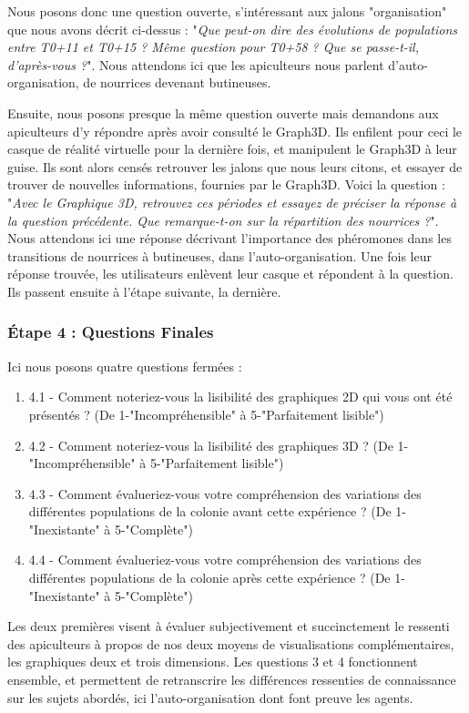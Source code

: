 			Nous posons donc une question ouverte, s'intéressant aux jalons "organisation" que nous avons décrit ci-dessus : "\textit{Que peut-on dire des évolutions de populations entre T0+11 et T0+15 ? Même question pour T0+58 ? Que se passe-t-il, d'après-vous ?}". Nous attendons ici que les apiculteurs nous parlent d'auto-organisation, de nourrices devenant butineuses.
			
			Ensuite, nous posons presque la même question ouverte mais demandons aux apiculteurs d'y répondre après avoir consulté le Graph3D. Ils enfilent pour ceci le casque de réalité virtuelle pour la dernière fois, et manipulent le Graph3D à leur guise. Ils sont alors censés retrouver les jalons que nous leurs citons, et essayer de trouver de nouvelles informations, fournies par le Graph3D. Voici la question : "\textit{Avec le Graphique 3D, retrouvez ces périodes et essayez de préciser la réponse à la question précédente. Que remarque-t-on sur la répartition des nourrices ?}". Nous attendons ici une réponse décrivant l'importance des phéromones dans les transitions de nourrices à butineuses, dans l'auto-organisation. Une fois leur réponse trouvée, les utilisateurs enlèvent leur casque et répondent à la question. Ils passent ensuite à l'étape suivante, la dernière.
			
			\subsubsection{Étape 4 : Questions Finales}
			Ici nous posons quatre questions fermées :
			\begin{enumerate}
				\item 4.1 - Comment noteriez-vous la lisibilité des graphiques 2D qui vous ont été présentés ? (De 1-"Incompréhensible" à 5-"Parfaitement lisible")
				\item 4.2 - Comment noteriez-vous la lisibilité des graphiques 3D ? (De 1-"Incompréhensible" à 5-"Parfaitement lisible")
				\item 4.3 - Comment évalueriez-vous votre compréhension des variations des différentes populations de la colonie avant cette expérience ? (De 1-"Inexistante" à 5-"Complète")
				\item 4.4 - Comment évalueriez-vous votre compréhension des variations des différentes populations de la colonie après cette expérience ? (De 1-"Inexistante" à 5-"Complète")
			\end{enumerate}
			
			Les deux premières visent à évaluer subjectivement et succinctement le ressenti des apiculteurs à propos de nos deux moyens de visualisations complémentaires, les graphiques deux et trois dimensions.
			Les questions 3 et 4 fonctionnent ensemble, et permettent de retranscrire les différences ressenties de connaissance sur les sujets abordés, ici l'auto-organisation dont font preuve les agents.
		
